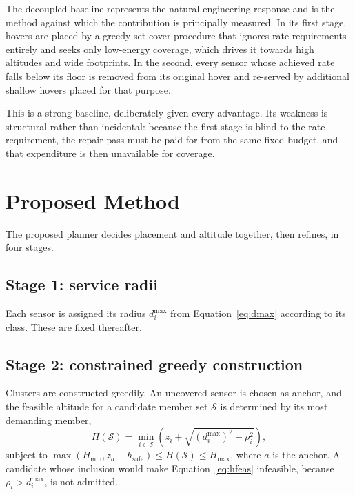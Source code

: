 The decoupled baseline represents the natural engineering response and is the method against which the contribution is principally measured. In its first stage, hovers are placed by a greedy set-cover procedure that ignores rate requirements entirely and seeks only low-energy coverage, which drives it towards high altitudes and wide footprints. In the second, every sensor whose achieved rate falls below its floor is removed from its original hover and re-served by additional shallow hovers placed for that purpose.

This is a strong baseline, deliberately given every advantage. Its weakness is structural rather than incidental: because the first stage is blind to the rate requirement, the repair pass must be paid for from the same fixed budget, and that expenditure is then unavailable for coverage.

\section{Proposed Method}

The proposed planner decides placement and altitude together, then refines, in four stages.

\subsection{Stage 1: service radii}

Each sensor is assigned its radius $d^{\max}_i$ from Equation~\eqref{eq:dmax} according to its class. These are fixed thereafter.

\subsection{Stage 2: constrained greedy construction}

Clusters are constructed greedily. An uncovered sensor is chosen as anchor, and the feasible altitude for a candidate member set $\mathcal{S}$ is determined by its most demanding member,
\begin{equation}
H(\mathcal{S}) = \min_{i \in \mathcal{S}} \left( z_i + \sqrt{ \left( d^{\max}_i \right)^2 - \rho_i^2 } \right),
\label{eq:hfeas}
\end{equation}
subject to $\max( H_{\min}, z_a + h_{\mathrm{safe}} ) \le H(\mathcal{S}) \le H_{\max}$, where $a$ is the anchor. A candidate whose inclusion would make Equation~\eqref{eq:hfeas} infeasible, because $\rho_i > d^{\max}_i$, is not admitted.

